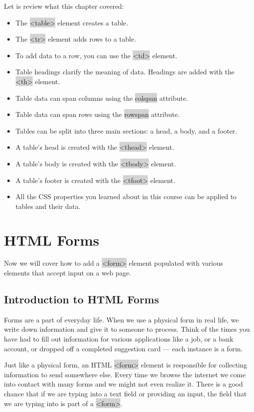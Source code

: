 \documentclass[11pt]{article}
\begin{document}
Let is review what this chapter covered:
\begin{itemize}[leftmargin = *]
\item The \colorbox{lightgray}{<table>} element creates a table.
\item The \colorbox{lightgray}{<tr>} element adds rows to a table.
\item To add data to a row, you can use the \colorbox{lightgray}{<td>} element.
\item Table headings clarify the meaning of data. Headings are added with the \colorbox{lightgray}{<th>} element.
\item Table data can span columns using the \colorbox{lightgray}{colspan} attribute.
\item Table data can span rows using the \colorbox{lightgray}{rowspan} attribute.
\item Tables can be split into three main sections: a head, a body, and a footer.
\item A table’s head is created with the \colorbox{lightgray}{<thead>} element.
\item A table’s body is created with the \colorbox{lightgray}{<tbody>} element.
\item A table’s footer is created with the \colorbox{lightgray}{<tfoot>} element.
\item All the CSS properties you learned about in this course can be applied to tables and their data.
\end{itemize}

\newpage
\section{HTML Forms}
Now we will cover how to add a \colorbox{lightgray}{<form>} element populated with various elements that accept input on a web page.
\subsection{Introduction to HTML Forms}
Forms are a part of everyday life. When we use a physical form in real life, we write down information and give it to someone to process. Think of the times you have had to fill out information for various applications like a job, or a bank account, or dropped off a completed suggestion card — each instance is a form.

Just like a physical form, an HTML \colorbox{lightgray}{<form>} element is responsible for collecting information to send somewhere else. Every time we browse the internet we come into contact with many forms and we might not even realize it. There is a good chance that if we are typing into a text field or providing an input, the field that we are typing into is part of a \colorbox{lightgray}{<form>}.
\end{document}
